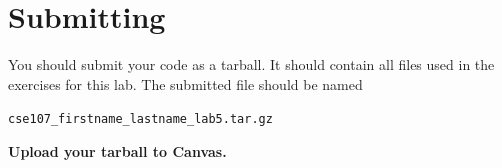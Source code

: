 \documentclass[11pt]{cselabheader}
\begin{document}
\pagebreak
\section{Submitting}

You should submit your code as a tarball. It should contain all files
used in the exercises for this lab. The submitted file should be named
\begin{center}
  \texttt{cse107\_firstname\_lastname\_lab5.tar.gz}
\end{center}

\begin{center}
  \textbf{Upload your tarball to Canvas.}
\end{center}

\listoftheorems
\end{document}
